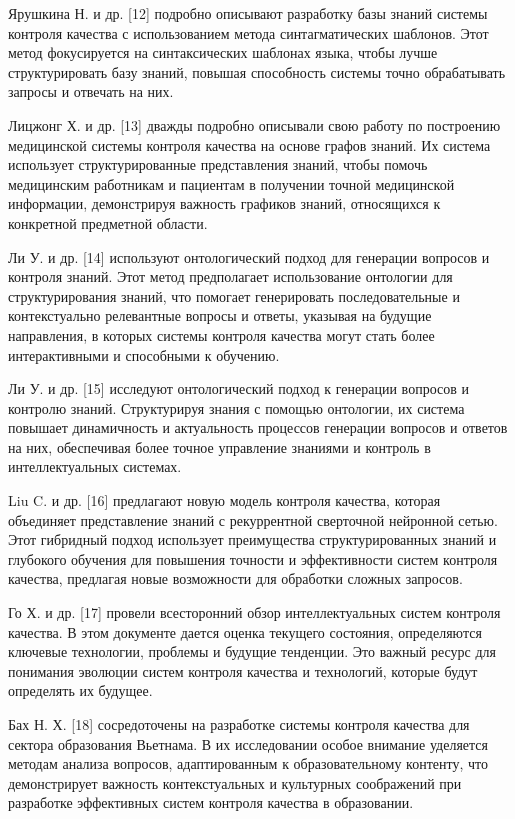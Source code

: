 Ярушкина Н. и др. {[}12{]} подробно описывают разработку базы знаний
системы контроля качества с использованием метода синтагматических
шаблонов. Этот метод фокусируется на синтаксических шаблонах языка,
чтобы лучше структурировать базу знаний, повышая способность системы
точно обрабатывать запросы и отвечать на них.

Лицжонг Х. и др. {[}13{]} дважды подробно описывали свою работу по
построению медицинской системы контроля качества на основе графов
знаний. Их система использует структурированные представления знаний,
чтобы помочь медицинским работникам и пациентам в получении точной
медицинской информации, демонстрируя важность графиков знаний,
относящихся к конкретной предметной области.

Ли У. и др. {[}14{]} используют онтологический подход для генерации
вопросов и контроля знаний. Этот метод предполагает использование
онтологии для структурирования знаний, что помогает генерировать
последовательные и контекстуально релевантные вопросы и ответы, указывая
на будущие направления, в которых системы контроля качества могут стать
более интерактивными и способными к обучению.

Ли У. и др. {[}15{]} исследуют онтологический подход к генерации
вопросов и контролю знаний. Структурируя знания с помощью онтологии, их
система повышает динамичность и актуальность процессов генерации
вопросов и ответов на них, обеспечивая более точное управление знаниями
и контроль в интеллектуальных системах.

Liu C. и др. {[}16{]} предлагают новую модель контроля качества, которая
объединяет представление знаний с рекуррентной сверточной нейронной
сетью. Этот гибридный подход использует преимущества структурированных
знаний и глубокого обучения для повышения точности и эффективности
систем контроля качества, предлагая новые возможности для обработки
сложных запросов.

Го Х. и др. {[}17{]} провели всесторонний обзор интеллектуальных систем
контроля качества. В этом документе дается оценка текущего состояния,
определяются ключевые технологии, проблемы и будущие тенденции. Это
важный ресурс для понимания эволюции систем контроля качества и
технологий, которые будут определять их будущее.

Бах Н. Х. {[}18{]} сосредоточены на разработке системы контроля качества
для сектора образования Вьетнама. В их исследовании особое внимание
уделяется методам анализа вопросов, адаптированным к образовательному
контенту, что демонстрирует важность контекстуальных и культурных
соображений при разработке эффективных систем контроля качества в
образовании.

